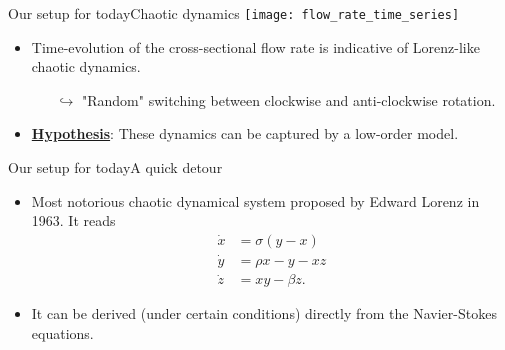 \begin{frame}[t, c]{Our setup for today}{Chaotic dynamics}
		\centering
		\texttt{[image: flow\_rate\_time\_series]}

		\begin{itemize}
			\item Time-evolution of the cross-sectional flow rate is indicative of Lorenz-like chaotic dynamics.
			\begin{itemize}
				\item[\(	\hookrightarrow	\)] "Random" switching between clockwise and anti-clockwise rotation.
			\end{itemize}

			\medskip

			\item \underline{\textbf{Hypothesis}}: These dynamics can be captured by a low-order model.
		\end{itemize}
  \vspace{1cm}
\end{frame}

\begin{frame}[t, c]{Our setup for today}{A quick detour}
	\begin{minipage}{.58\textwidth}
		\begin{itemize}
			\item Most notorious chaotic dynamical system proposed by Edward Lorenz in 1963.
			It reads
			\[
				\begin{aligned}
					\dot{x} & = \sigma \left( y - x \right) \\
					\dot{y} & = \rho x - y - xz \\
					\dot{z} & = xy - \beta z.
				\end{aligned}
			\]

			\medskip

			\item It can be derived (under certain conditions) directly from the Navier-Stokes equations.
		\end{itemize}
	\end{minipage}%
	\hfill
	\begin{minipage}{.38\textwidth}
	\end{minipage}

	\vspace{1cm}
\end{frame}

